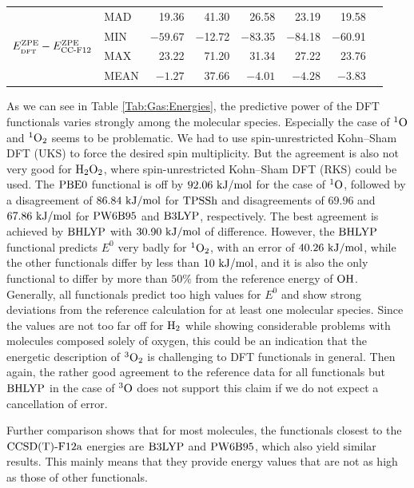 \begin{table}[t!]
\begin{adjustbox}{width=1.0\textwidth,center}
\begin{tabular}{lll|lDDDDD|r}
       &
       MAD   & 19.36 & 41.30 & 26.58 & 23.19 & 19.58  &  \\
      & & & MIN   & $-59.67$ & $-$12.72 & $-$83.35 & $-$84.18 & $-$60.91 & \\
      & & & MAX   & 23.22 & 71.20 & 31.34 & 27.22 & 23.76  & \\
      & & & MEAN  & $-1.27$ & 37.66 & $-4.01$ & $-4.28$  & $-3.83$ \\[2pt]
    \end{tabular}%
  \label{Tab:Gas:Reactions}%
\end{adjustbox}
\end{table}%

As we can see in Table \ref{Tab:Gas:Energies}, the predictive power
of the DFT functionals varies strongly among the molecular species.
Especially the case of ${^1\text{O}}$ and ${^1\text O_2}$ seems to be problematic. We had
to use spin-unrestricted Kohn--Sham DFT (UKS) to force the desired spin
multiplicity. But the agreement is also not very good for $\text H _2 \text O_2$, where
spin-unrestricted Kohn--Sham DFT (RKS) could be used.
The $\text{PBE0}$ functional is off by $92.06~\text {kJ/mol}$ for the case of ${^1\text{O}}$, followed
by a disagreement of $86.84~\text {kJ/mol}$ for $\text{TPSSh}$ and disagreements
of $69.96$ and $67.86~\text {kJ/mol}$ for $\text{PW6B95}$ and $\text{B3LYP}$, respectively.
The best agreement is achieved by $\text{BHLYP}$ with $30.90~\text {kJ/mol}$ of
difference. However, the $\text{BHLYP}$ functional predicts 
$E^0$ very badly for ${^1\text O_2}$, with an error of $40.26~\text {kJ/mol}$,
while the other functionals differ by less than $10~\text {kJ/mol}$, and it is also
the only functional to differ by more than $50\%$ from the reference energy
of $\text O \text H$. Generally, all functionals predict too high values for $E^0$
and show strong deviations from the reference calculation for at least one
molecular species.
Since the values are not too far off for $\text H_2$ while showing
considerable problems with molecules composed solely of oxygen,
this could be an indication that the energetic description of ${^3\text O_2}$
is challenging to DFT functionals in general. Then again, the rather good
agreement to the reference data for all functionals but $\text{BHLYP}$ in the case
of ${^3\text{O}}$ does not support this claim if we do not expect
a cancellation of error.

Further comparison shows that for most molecules, the functionals
closest to the $\text{CCSD(T)-F12a}$ energies are $\text{B3LYP}$ and $\text{PW6B95}$, which
also yield similar results. This mainly means that they provide
energy values that are not as high as those of other functionals. 

